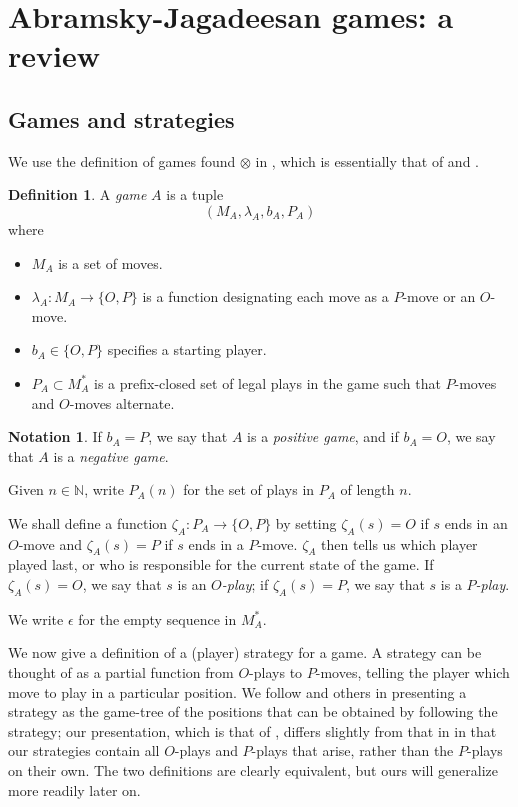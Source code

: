 \documentclass[11pt]{article} %
\theoremstyle{plain} %
\theoremstyle{definition} %
\newtheorem{definition}[theorem]{Definition}
\newtheorem{notation}[theorem]{Notation}
\theoremstyle{exercisestyle}
\newcommand*\from{\colon}
\newcommand{\cmap}[3]{#1\from{}#2\to{}#3}
\begin{document}
\section{Abramsky-Jagadeesan games: a review}
\label{abjagreview}

\subsection{Games and strategies}

We use the definition of games found $\otimes$ in \cite{martinsthesis}, which is essentially that of \cite{blassgames} and \cite{abramskyjagadeesangames}.  

\begin{definition}
  A \emph{game} $A$ is a tuple
  \[
    (M_A, \lambda_A, b_A, P_A)
  \]
  where
  \begin{itemize}
    \item $M_A$ is a set of moves.
    \item $\cmap{\lambda_A}{M_A}{\{O,P\}}$ is a function designating each move as a $P$-move or an $O$-move.
    \item $b_A\in\{O,P\}$ specifies a starting player.
    \item $P_A\subset M_A^*$ is a prefix-closed set of legal plays in the game such that $P$-moves and $O$-moves alternate.
  \end{itemize}
\end{definition}

\begin{notation}
  If $b_A=P$, we say that $A$ is a \emph{positive game}, and if $b_A=O$, we say that $A$ is a \emph{negative game}.

  Given $n\in\mathbb N$, write $P_A(n)$ for the set of plays in $P_A$ of length $n$.  

  We shall define a function $\cmap{\zeta_A}{P_A}{\{O,P\}}$ by setting $\zeta_A(s)=O$ if $s$ ends in an $O$-move and $\zeta_A(s)=P$ if $s$ ends in a $P$-move.   $\zeta_A$ then tells us which player played last, or who is responsible for the current state of the game.  If $\zeta_A(s)=O$, we say that $s$ is an \emph{$O$-play}; if $\zeta_A(s)=P$, we say that $s$ is a \emph{$P$-play}.  

  We write $\epsilon$ for the empty sequence in $M_A^*$.
\end{notation}

We now give a definition of a (player) strategy for a game.  A strategy can be thought of as a partial function from $O$-plays to $P$-moves, telling the player which move to play in a particular position.  We follow \cite{abramskyjagadeesangames} and others in presenting a strategy as the game-tree of the positions that can be obtained by following the strategy; our presentation, which is that of \cite{abramskyjagadeesangames},  differs slightly from that in \cite{martinsthesis} in that our strategies contain all $O$-plays and $P$-plays that arise, rather than the $P$-plays on their own.  The two definitions are clearly equivalent, but ours will generalize more readily later on.
\end{document}
